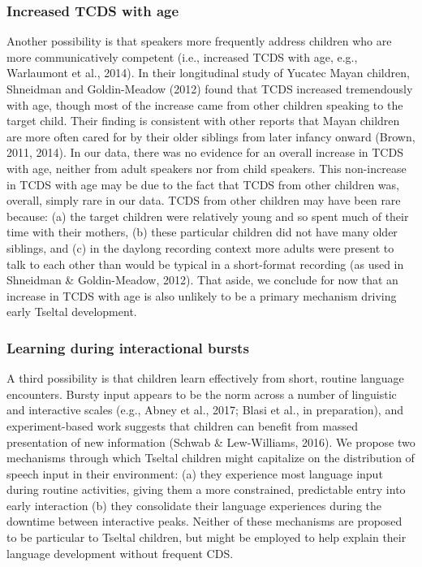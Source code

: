 \documentclass[floatsintext,man]{apa6}
\theoremstyle{definition}
\theoremstyle{definition}
\theoremstyle{definition}
\theoremstyle{remark}
\begin{document}
\subsubsection{Increased TCDS with age}\label{increased-tcds-with-age}

Another possibility is that speakers more frequently address children
who are more communicatively competent (i.e., increased TCDS with age,
e.g., Warlaumont et al., 2014). In their longitudinal study of Yucatec
Mayan children, Shneidman and Goldin-Meadow (2012) found that TCDS
increased tremendously with age, though most of the increase came from
other children speaking to the target child. Their finding is consistent
with other reports that Mayan children are more often cared for by their
older siblings from later infancy onward (Brown, 2011, 2014). In our
data, there was no evidence for an overall increase in TCDS with age,
neither from adult speakers nor from child speakers. This non-increase
in TCDS with age may be due to the fact that TCDS from other children
was, overall, simply rare in our data. TCDS from other children may have
been rare because: (a) the target children were relatively young and so
spent much of their time with their mothers, (b) these particular
children did not have many older siblings, and (c) in the daylong
recording context more adults were present to talk to each other than
would be typical in a short-format recording (as used in Shneidman \&
Goldin-Meadow, 2012). That aside, we conclude for now that an increase
in TCDS with age is also unlikely to be a primary mechanism driving
early Tseltal development.

\subsubsection{Learning during interactional
bursts}\label{learning-during-interactional-bursts}

A third possibility is that children learn effectively from short,
routine language encounters. Bursty input appears to be the norm across
a number of linguistic and interactive scales (e.g., Abney et al., 2017;
Blasi et al., in preparation), and experiment-based work suggests that
children can benefit from massed presentation of new information (Schwab
\& Lew-Williams, 2016). We propose two mechanisms through which Tseltal
children might capitalize on the distribution of speech input in their
environment: (a) they experience most language input during routine
activities, giving them a more constrained, predictable entry into early
interaction (b) they consolidate their language experiences during the
downtime between interactive peaks. Neither of these mechanisms are
proposed to be particular to Tseltal children, but might be employed to
help explain their language development without frequent CDS.
\end{document}
